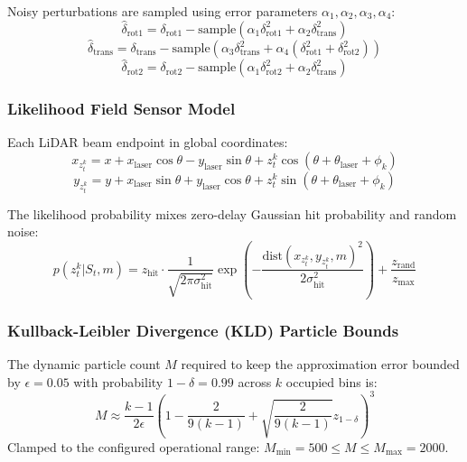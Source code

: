 \documentclass[10pt,a4paper]{article}
\begin{document}
Noisy perturbations are sampled using error parameters $\alpha_1, \alpha_2, \alpha_3, \alpha_4$:
\begin{equation}
\hat{\delta}_{\text{rot1}} = \delta_{\text{rot1}} - \text{sample}(\alpha_1 \delta_{\text{rot1}}^2 + \alpha_2 \delta_{\text{trans}}^2)
\end{equation}
\begin{equation}
\hat{\delta}_{\text{trans}} = \delta_{\text{trans}} - \text{sample}(\alpha_3 \delta_{\text{trans}}^2 + \alpha_4 (\delta_{\text{rot1}}^2 + \delta_{\text{rot2}}^2))
\end{equation}
\begin{equation}
\hat{\delta}_{\text{rot2}} = \delta_{\text{rot2}} - \text{sample}(\alpha_1 \delta_{\text{rot2}}^2 + \alpha_2 \delta_{\text{trans}}^2)
\end{equation}

\subsubsection{Likelihood Field Sensor Model}
Each LiDAR beam endpoint in global coordinates:
\begin{equation}
x_{z_t^k} = x + x_{\text{laser}}\cos\theta - y_{\text{laser}}\sin\theta + z_t^k \cos(\theta + \theta_{\text{laser}} + \phi_k)
\end{equation}
\begin{equation}
y_{z_t^k} = y + x_{\text{laser}}\sin\theta + y_{\text{laser}}\cos\theta + z_t^k \sin(\theta + \theta_{\text{laser}} + \phi_k)
\end{equation}

The likelihood probability mixes zero-delay Gaussian hit probability and random noise:
\begin{equation}
p(z_t^k | S_t, m) = z_{\text{hit}} \cdot \frac{1}{\sqrt{2\pi \sigma_{\text{hit}}^2}} \exp\left(-\frac{\text{dist}(x_{z_t^k}, y_{z_t^k}, m)^2}{2\sigma_{\text{hit}}^2}\right) + \frac{z_{\text{rand}}}{z_{\text{max}}}
\end{equation}

\subsubsection{Kullback-Leibler Divergence (KLD) Particle Bounds}
The dynamic particle count $M$ required to keep the approximation error bounded by $\epsilon = 0.05$ with probability $1 - \delta = 0.99$ across $k$ occupied bins is:
\begin{equation}
M \approx \frac{k - 1}{2\epsilon} \left(1 - \frac{2}{9(k-1)} + \sqrt{\frac{2}{9(k-1)}} z_{1-\delta}\right)^3
\end{equation}
Clamped to the configured operational range: $M_{\text{min}} = 500 \le M \le M_{\text{max}} = 2000$.
\end{document}
